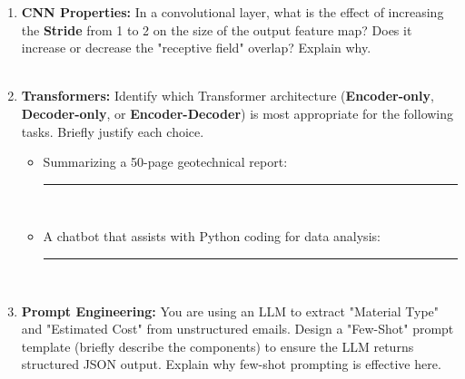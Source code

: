 \documentclass[12pt]{article}
\begin{document}
\begin{enumerate}[label=(\alph*)]
    \item \textbf{CNN Properties:} In a convolutional layer, what is the effect of increasing the \textbf{Stride} from 1 to 2 on the size of the output feature map? Does it increase or decrease the "receptive field" overlap? Explain why. \\
    \fullunderline \\
    \fullunderline

    \item \textbf{Transformers:} Identify which Transformer architecture (\textbf{Encoder-only}, \textbf{Decoder-only}, or \textbf{Encoder-Decoder}) is most appropriate for the following tasks. Briefly justify each choice.
    \begin{itemize}
        \item Summarizing a 50-page geotechnical report: \rule{1.5in}{0.15mm} \\
        \fullunderline
        \item A chatbot that assists with Python coding for data analysis: \rule{1.5in}{0.15mm} \\
        \fullunderline
    \end{itemize}

    \item \textbf{Prompt Engineering:} You are using an LLM to extract "Material Type" and "Estimated Cost" from unstructured emails. Design a "Few-Shot" prompt template (briefly describe the components) to ensure the LLM returns structured JSON output. Explain why few-shot prompting is effective here. \\
    \fullunderline \\
    \fullunderline \\
    \fullunderline
\end{enumerate}
\end{document}
